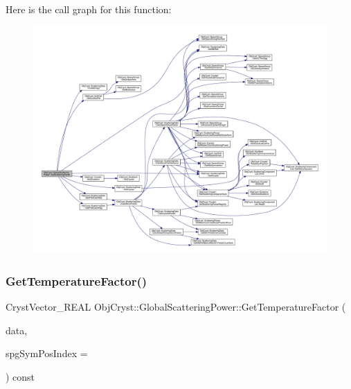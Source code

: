 Here is the call graph for this function\+:
\nopagebreak
\begin{figure}[H]
\begin{center}
\leavevmode
\includegraphics[width=350pt]{class_obj_cryst_1_1_global_scattering_power_af81844742d8cfdca7dec979a08e4abf0_cgraph}
\end{center}
\end{figure}
\mbox{\label{class_obj_cryst_1_1_global_scattering_power_a52a96c9df409e14e5209fa0d1c16781c}} 
\subsubsection{\texorpdfstring{GetTemperatureFactor()}{GetTemperatureFactor()}}
{\footnotesize\ttfamily Cryst\+Vector\+\_\+\+R\+E\+AL Obj\+Cryst\+::\+Global\+Scattering\+Power\+::\+Get\+Temperature\+Factor (\begin{DoxyParamCaption}\item[{const \mbox{\hyperlink{class_obj_cryst_1_1_scattering_data}{Scattering\+Data}} \&}]{data,  }\item[{const int}]{spg\+Sym\+Pos\+Index = {} }\end{DoxyParamCaption}) const\hspace{0.3cm}{\ttfamily [virtual]}}



